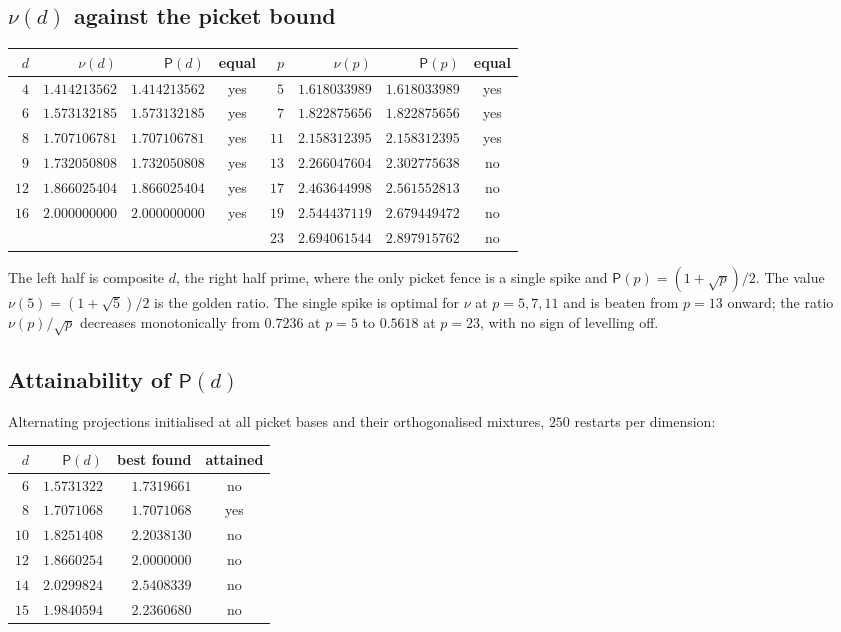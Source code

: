 \documentclass[11pt,reqno]{amsart}
\theoremstyle{plain}
\theoremstyle{definition}
\theoremstyle{remark}
\newcommand{\Pp}{\mathsf{P}}
\begin{document}
\subsection{$\nu(d)$ against the picket bound}

\begin{center}
\begin{tabular}{rrrc@{\qquad}rrrc}
\toprule
$d$ & $\nu(d)$ & $\Pp(d)$ & equal &
$p$ & $\nu(p)$ & $\Pp(p)$ & equal \\
\midrule
$4$  & $1.414213562$ & $1.414213562$ & yes &
$5$  & $1.618033989$ & $1.618033989$ & yes \\
$6$  & $1.573132185$ & $1.573132185$ & yes &
$7$  & $1.822875656$ & $1.822875656$ & yes \\
$8$  & $1.707106781$ & $1.707106781$ & yes &
$11$ & $2.158312395$ & $2.158312395$ & yes \\
$9$  & $1.732050808$ & $1.732050808$ & yes &
$13$ & $2.266047604$ & $2.302775638$ & no \\
$12$ & $1.866025404$ & $1.866025404$ & yes &
$17$ & $2.463644998$ & $2.561552813$ & no \\
$16$ & $2.000000000$ & $2.000000000$ & yes &
$19$ & $2.544437119$ & $2.679449472$ & no \\
     &               &               &     &
$23$ & $2.694061544$ & $2.897915762$ & no \\
\bottomrule
\end{tabular}
\end{center}

The left half is composite $d$, the right half prime, where the only
picket fence is a single spike and $\Pp(p)=(1+\sqrt p)/2$.  The value
$\nu(5)=(1+\sqrt5)/2$ is the golden ratio.  The single spike is optimal
for $\nu$ at $p=5,7,11$ and is beaten from $p=13$ onward; the ratio
$\nu(p)/\sqrt p$ decreases monotonically from $0.7236$ at $p=5$ to
$0.5618$ at $p=23$, with no sign of levelling off.

\subsection{Attainability of $\Pp(d)$}

Alternating projections initialised at all picket bases and their
orthogonalised mixtures, $250$ restarts per dimension:

\begin{center}
\begin{tabular}{rrrc}
\toprule
$d$ & $\Pp(d)$ & best found & attained \\
\midrule
$6$  & $1.5731322$ & $1.7319661$ & no \\
$8$  & $1.7071068$ & $1.7071068$ & yes \\
$10$ & $1.8251408$ & $2.2038130$ & no \\
$12$ & $1.8660254$ & $2.0000000$ & no \\
$14$ & $2.0299824$ & $2.5408339$ & no \\
$15$ & $1.9840594$ & $2.2360680$ & no \\
\bottomrule
\end{tabular}
\end{center}
\end{document}
